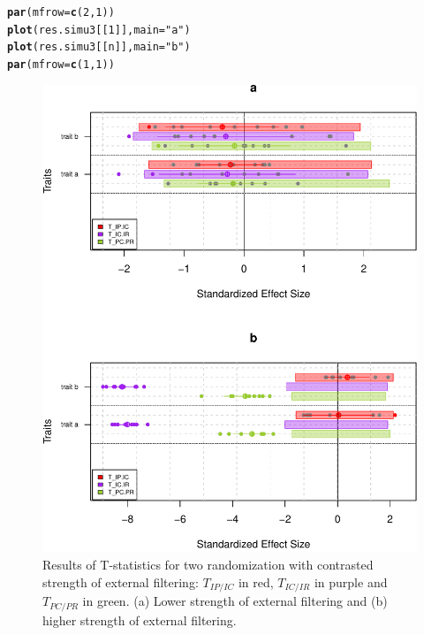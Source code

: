 \documentclass[12pt]{article}\usepackage[]{graphicx}\usepackage[]{color}
\makeatletter
\def\maxwidth{ %
  \ifdim\Gin@nat@width>\linewidth
    \linewidth
  \else
    \Gin@nat@width
  \fi
}
\newcommand{\hlnum}[1]{\textcolor[rgb]{0.686,0.059,0.569}{#1}}%
\newcommand{\hlstr}[1]{\textcolor[rgb]{0.192,0.494,0.8}{#1}}%
\newcommand{\hlstd}[1]{\textcolor[rgb]{0.345,0.345,0.345}{#1}}%
\newcommand{\hlkwc}[1]{\textcolor[rgb]{0.333,0.667,0.333}{#1}}%
\newcommand{\hlkwd}[1]{\textcolor[rgb]{0.737,0.353,0.396}{\textbf{#1}}}%
\newenvironment{kframe}{%
 \def\at@end@of@kframe{}%
 \ifinner\ifhmode%
  \def\at@end@of@kframe{\end{minipage}}%
  \begin{minipage}{\columnwidth}%
 \fi\fi%
 \def\FrameCommand##1{\hskip\@totalleftmargin \hskip-\fboxsep
 \colorbox{shadecolor}{##1}\hskip-\fboxsep
     \hskip-\linewidth \hskip-\@totalleftmargin \hskip\columnwidth}%
 \MakeFramed {\advance\hsize-\width
   \@totalleftmargin\z@ \linewidth\hsize
   \@setminipage}}%
 {\par\unskip\endMakeFramed%
 \at@end@of@kframe}
\newenvironment{knitrout}{}{} %
\makeatother
\begin{document}
\begin{knitrout}\small
{}\color{fgcolor}\begin{kframe}
\begin{alltt}
\hlkwd{par}\hlstd{(}\hlkwc{mfrow}\hlstd{=}\hlkwd{c}\hlstd{(}\hlnum{2}\hlstd{,} \hlnum{1}\hlstd{))}
\hlkwd{plot}\hlstd{(res.simu3[[}\hlnum{1}\hlstd{]],} \hlkwc{main} \hlstd{=} \hlstr{"a"}\hlstd{)}
\hlkwd{plot}\hlstd{(res.simu3[[n]],} \hlkwc{main} \hlstd{=} \hlstr{"b"}\hlstd{)}
\hlkwd{par}\hlstd{(}\hlkwc{mfrow}\hlstd{=}\hlkwd{c}\hlstd{(}\hlnum{1}\hlstd{,} \hlnum{1}\hlstd{))}
\end{alltt}
\end{kframe}\begin{figure}

{\centering \includegraphics[width=\maxwidth]{figure/typical_results_external_filtering2-1} 

}

\caption[Results of T-statistics for two randomization with contrasted strength of external filtering]{Results of T-statistics for two randomization with contrasted strength of external filtering: $T_{IP/IC}$ in red, $T_{IC/IR}$ in purple and $T_{PC/PR}$ in green. (a) Lower strength of external filtering and (b) higher strength of external filtering.}\label{fig:typical_results_external_filtering2}
\end{figure}


\end{knitrout}
\end{document}
